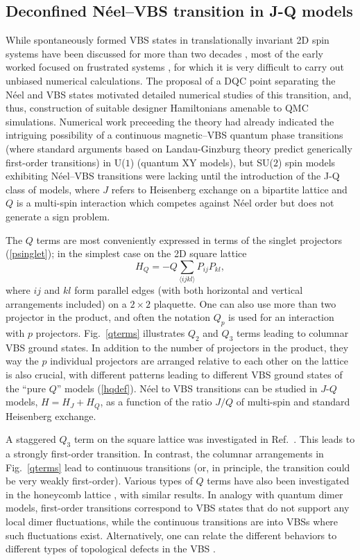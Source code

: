 \documentclass[range]{ar2e}
\begin{document}
\subsection{Deconfined N\'eel--VBS transition in J-Q models}
\label{ss:jq2}
While spontaneously formed VBS states in translationally invariant 2D spin systems have been discussed for more than two decades \cite{Chandra88,Dagotto89,Read89},
most of the early worked focused on frustrated systems \cite{Dagotto89,Schulz96,Capriotti01}, for which it is very difficult to carry out unbiased numerical 
calculations. The proposal of a DQC point separating the N\'eel and VBS states motivated detailed numerical studies of this transition, and, thus, construction 
of suitable designer 
Hamiltonians amenable to QMC simulations. Numerical work preceeding the theory \cite{Sandvik02} had already indicated the intriguing possibility of 
a continuous magnetic--VBS quantum phase transitions (where standard arguments based on Landau-Ginzburg theory predict generically first-order transitions) in
U($1$) (quantum XY models), but SU($2$) spin models exhibiting N\'eel--VBS transitions were lacking until the introduction of the J-Q class of models, where 
$J$ refers to Heisenberg exchange on a bipartite lattice and $Q$ is a multi-spin interaction which competes against N\'eel order but does not generate 
a sign problem. 

The $Q$ terms are most conveniently expressed in terms of the singlet projectors (\ref{psinglet}); in the simplest case on the 2D square lattice
\begin{equation}
H_Q = - Q\sum_{\langle ijkl\rangle } P_{ij}P_{kl},
\label{hqdef}
\end{equation}
where $ij$ and $kl$ form parallel edges (with both horizontal and vertical arrangements included) on a $2\times 2$ plaquette. 
One can also use more than two projector in the product, and often the notation $Q_p$ is used for an interaction with $p$ projectors. 
Fig.~\ref{qterms} illustrates $Q_2$ and $Q_3$ terms leading to columnar VBS ground states. In addition to the number of projectors in the product, 
they way the $p$ individual projectors are arranged relative to each other on the lattice is also crucial, with different patterns leading to different 
VBS ground states of the ``pure $Q$'' models (\ref{hqdef}). N\'eel to VBS transitions can be studied in $J$-$Q$ models, $H=H_J+H_Q$, as a function of
the ratio $J/Q$ of multi-spin and standard Heisenberg exchange. 

A staggered $Q_3$ term on the square lattice was investigated in Ref.~\cite{Sen10}. This leads to a strongly first-order transition. In contrast, 
the columnar arrangements in Fig.~\ref{qterms} lead to continuous transitions (or, in principle, the transition could be very weakly first-order). 
Various types of $Q$ terms have also been investigated in the honeycomb lattice \cite{Banerjee11}, with similar results. In analogy with quantum 
dimer models, first-order transitions correspond to VBS states that do not support any local dimer fluctuations, while the continuous transitions 
are into VBSs where such fluctuations exist. Alternatively, one can relate the different behaviors to different types of topological 
defects in the VBS \cite{Banerjee11}.
\end{document}
